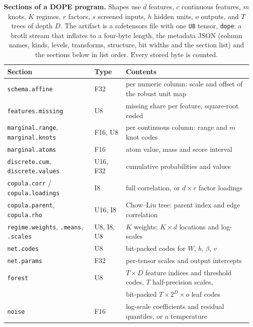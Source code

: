 \documentclass[10pt,letterpaper]{article}
\begin{document}
\begin{table}[h]
\centering
\caption{\textbf{Sections of a DOPE program.} Shapes use $d$ features, $c$ continuous features, $m$ knots,
$K$ regimes, $r$ factors, $s$ screened inputs, $h$ hidden units, $o$ outputs, and $T$ trees of depth $D$. The
artifact is a safetensors file with one \texttt{U8} tensor, \texttt{dope}: a brotli stream that inflates to a
four-byte length, the metadata JSON (column names, kinds, levels, transforms, structure, bit widths and the
section list) and the sections below in list order. Every stored byte is counted.}
\label{tab:tensors}
\small
\begin{tabular}{lll}
\toprule
Section & Type & Contents\\
\midrule
\texttt{schema.affine} & F32 & per numeric column: scale and offset of the robust unit map\\
\texttt{features.missing} & U8 & missing share per feature, square-root coded\\
\texttt{marginal.range}, \texttt{marginal.knots} & F16, U8 & per continuous column: range and $m$ knot codes\\
\texttt{marginal.atoms} & F16 & atom value, mass and score interval\\
\texttt{discrete.cum}, \texttt{discrete.values} & U16, F32 & cumulative probabilities and values\\
\texttt{copula.corr} / \texttt{copula.loadings} & I8 & full correlation, or $d\times r$ factor loadings\\
\texttt{copula.parent}, \texttt{copula.rho} & U16, I8 & Chow--Liu tree: parent index and edge correlation\\
\texttt{regime.weights}, \texttt{.means}, \texttt{.scales} & U8, I8, U8 & $K$ weights; $K\times d$ locations and log-scales\\
\texttt{net.codes} & U8 & bit-packed codes for $W$, $b$, $\beta$, $v$\\
\texttt{net.params} & F32 & per-tensor scales and output intercepts\\
\texttt{forest} & U8 & $T\times D$ feature indices and threshold codes, $T$ half-precision scales,\\
 & & bit-packed $T\times 2^D\times o$ leaf codes\\
\texttt{noise} & F16 & log-scale coefficients and residual quantiles, or a temperature\\
\bottomrule
\end{tabular}
\end{table}
\end{document}
